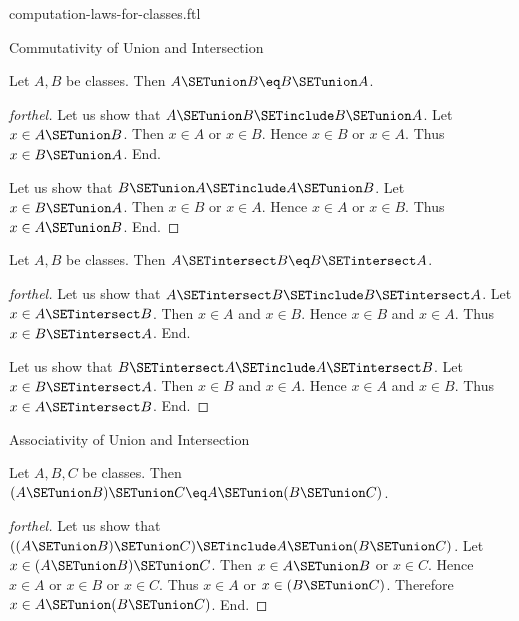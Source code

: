 \documentclass{naproche-library}
\begin{document}
\begin{smodule}[title=Computation Laws For Classes]{computation-laws-for-classes.ftl}

\begin{sfragment}{Commutativity of Union and Intersection}
  \begin{proposition}[forthel,id=FOUNDATIONS_02_8446177632583680]
    Let $A, B$ be classes.
    Then $A \SETunion B \eq B \SETunion A$.
  \end{proposition}
  \begin{proof}[forthel]
    Let us show that $A \SETunion B \SETinclude B \SETunion A$.
      Let $x \in A \SETunion B$.
      Then $x \in A$ or $x \in B$.
      Hence $x \in B$ or $x \in A$.
      Thus $x \in B \SETunion A$.
    End.

    Let us show that $B \SETunion A \SETinclude A \SETunion B$.
      Let $x \in B \SETunion A$.
      Then $x \in B$ or $x \in A$.
      Hence $x \in A$ or $x \in B$.
      Thus $x \in A \SETunion B$.
    End.
  \end{proof}

  \begin{proposition}[forthel,id=FOUNDATIONS_02_7565102251245568]
    Let $A, B$ be classes.
    Then $A \SETintersect B \eq B \SETintersect A$.
  \end{proposition}
  \begin{proof}[forthel]
    Let us show that $A \SETintersect B \SETinclude B \SETintersect A$.
      Let $x \in A \SETintersect B$.
      Then $x \in A$ and $x \in B$.
      Hence $x \in B$ and $x \in A$.
      Thus $x \in B \SETintersect A$.
    End.

    Let us show that $B \SETintersect A \SETinclude A \SETintersect B$.
      Let $x \in B \SETintersect A$.
      Then $x \in B$ and $x \in A$.
      Hence $x \in A$ and $x \in B$.
      Thus $x \in A \SETintersect B$.
    End.
  \end{proof}
\end{sfragment}

\begin{sfragment}{Associativity of Union and Intersection}
  \begin{proposition}[forthel,id=FOUNDATIONS_02_3854032263184384]
    Let $A, B, C$ be classes.
    Then $(A \SETunion B) \SETunion C \eq A \SETunion (B \SETunion C)$.
  \end{proposition}
  \begin{proof}[forthel]
    Let us show that $((A \SETunion B) \SETunion C) \SETinclude A \SETunion (B \SETunion C)$. %
      Let $x \in (A \SETunion B) \SETunion C$.
      Then $x \in A \SETunion B$ or $x \in C$.
      Hence $x \in A$ or $x \in B$ or $x \in C$.
      Thus $x \in A$ or $x \in (B \SETunion C)$.
      Therefore $x \in A \SETunion (B \SETunion C)$.
    End.


\end{proof}
\end{sfragment}
\end{smodule}
\end{document}
